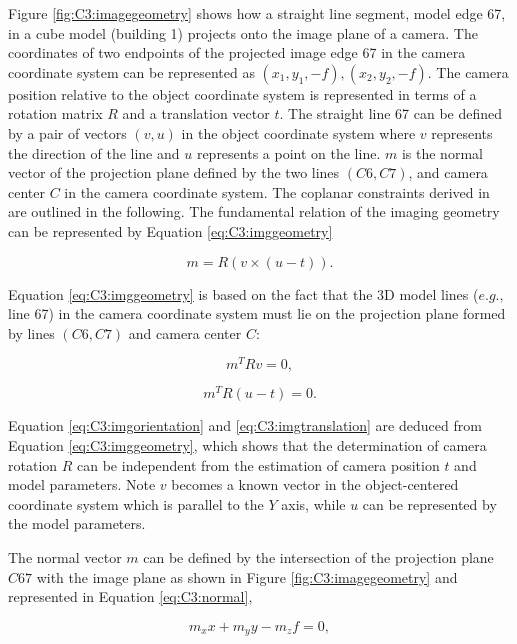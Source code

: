 Figure \ref{fig:C3:imagegeometry} shows how a straight line segment, model edge 67, in a cube model (building 1) projects onto the image plane of a camera. The coordinates of two endpoints of the projected image edge 67 in the camera coordinate system can be represented as ${(x_1, y_1, -f), (x_2, y_2, -f)}$. The camera position relative to the object coordinate system is represented in terms of a rotation matrix $R$ and a translation vector $t$. The straight line 67 can be defined by a pair of vectors $(v, u)$ in the object coordinate system where $v$ represents the direction of the line and $u$ represents a point on the line. $m$ is the normal vector of the projection plane defined by the two lines $(C6, C7)$, and camera center $C$ in the camera coordinate system. The coplanar constraints derived in \cite{Taylor95} are outlined in the following. The fundamental relation of the imaging geometry can be represented by Equation \ref {eq:C3:imggeometry}

\begin{equation}
    m = R (v \times (u-t)).
\label{eq:C3:imggeometry}
\end{equation} 

Equation \ref{eq:C3:imggeometry} is based on the fact that the 3D model lines ($e.g.,$ line 67) in the camera coordinate system must lie on the projection plane formed by lines $(C6, C7)$ and camera center $C$: 

\begin{equation}
    m^T Rv = 0,
\label{eq:C3:imgorientation}
\end{equation} 

\begin{equation}
    m^T R(u-t) = 0.
\label{eq:C3:imgtranslation}
\end{equation} 

Equation \ref{eq:C3:imgorientation} and \ref{eq:C3:imgtranslation} are deduced from Equation \ref{eq:C3:imggeometry}, which shows that the determination of camera rotation $R$ can be independent from the estimation of camera position $t$ and model parameters. Note $v$ becomes a known vector in the object-centered coordinate system which is parallel to the $Y$ axis, while $u$ can be represented by the model parameters.

The normal vector $m$ can be defined by the intersection of the projection plane $C67$ with the image plane as shown in Figure \ref{fig:C3:imagegeometry} and represented in Equation \ref{eq:C3:normal},

\begin{equation}
    m_xx + m_yy - m_zf = 0,
\label{eq:C3:normal}
\end{equation} 

